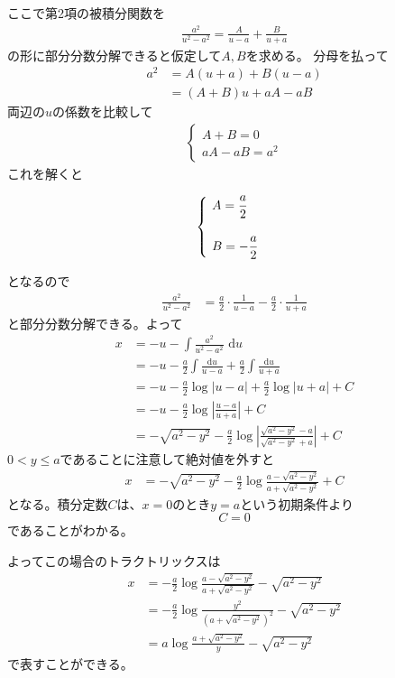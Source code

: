 ここで第2項の被積分関数を
\begin{align*}
  \frac{a^2}{u^2 - a^2} = \frac{A}{u - a} + \frac{B}{u + a}
\end{align*}
の形に部分分数分解できると仮定して$A,B$を求める。
分母を払って
\begin{align*}
  a^2 &= A(u + a) + B(u - a)\\
  &= (A + B)u + aA - aB
\end{align*}
両辺の$u$の係数を比較して
\begin{align*}
  \begin{cases}
    A + B = 0\\
    aA - aB = a^2
  \end{cases}
\end{align*}
これを解くと
\begin{spacing}{0.5}
  \begin{align*}
    \begin{cases}
      \,A = \dfrac{a}{2} \cr\cr
      \,B = - \dfrac{a}{2}
    \end{cases}
  \end{align*}
\end{spacing}\noindent
となるので
\begin{align*}
  \frac{a^2}{u^2 - a^2} &= \frac{a}{2}\cdot\frac{1}{u - a} - \frac{a}{2}\cdot\frac{1}{u + a}
\end{align*}
と部分分数分解できる。よって
\begin{align*}
  x &= - u - \int \frac{a^2}{u^2 - a^2} \,\,\mathrm{d}u \\
  &= - u - \frac{a}{2} \int \frac{\mathrm{d}u}{u - a} + \frac{a}{2} \int \frac{\mathrm{d}u}{u + a} \\
  &= - u - \frac{a}{2} \log{|u - a|} + \frac{a}{2}\log{|u + a|} + C \\
  &= - u - \frac{a}{2} \log{\left| \frac{u - a}{u + a} \right|} + C \\
  &= - \sqrt{a^2 - y^2} - \frac{a}{2} \log{\left| \frac{\sqrt{a^2 - y^2} - a}{\sqrt{a^2 - y^2} + a} \right|} + C
\end{align*}
$0 < y \leq a$であることに注意して絶対値を外すと
\begin{align*}
  x &= - \sqrt{a^2 - y^2} - \frac{a}{2} \log{\frac{a - \sqrt{a^2 - y^2}}{a + \sqrt{a^2 - y^2}}} + C
\end{align*}
となる。積分定数$C$は、$x = 0$のとき$y = a$という初期条件より
$$ C = 0$$
であることがわかる。\par
よってこの場合のトラクトリックスは
\begin{align*}
  x &= - \frac{a}{2} \log{\frac{a - \sqrt{a^2 - y^2}}{a + \sqrt{a^2 - y^2}}} - \sqrt{a^2 - y^2}\\
  &= - \frac{a}{2} \log{\frac{y^2}{(a + \sqrt{a^2 - y^2})^2}} - \sqrt{a^2 - y^2}\\
  &= a\log{\frac{a + \sqrt{a^2 - y^2}}{y}} - \sqrt{a^2 - y^2}
\end{align*}
で表すことができる。


